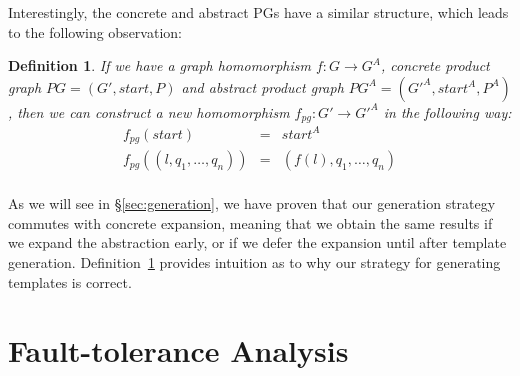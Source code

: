 \documentclass[numbers, 10pt, preprint]{sigplanconf}
\newcommand{\EG}{\emph{e.g.}}
\newcommand{\IE}{\emph{i.e.}}
\newtheorem{defn}{Definition}[section]
\begin{document}
Interestingly, the concrete and abstract PGs have a similar structure, which leads to the following observation:

\begin{defn}
\label{def:homomorphism}
If we have a graph homomorphism $f : G \rightarrow G^A$, concrete product graph $PG = (G',\mathit{start},P)$ and abstract product graph $PG^A = (G'^A, \mathit{start}^A, P^A)$, then we can construct a new homomorphism $f_{pg} : G' \rightarrow G'^A$ in the following way:
\[ \begin{array}{rcl}
  f_{pg}( \mathit{start} ) & = & \mathit{start}^A  \\
  f_{pg}( (l,q_1,\ldots,q_n) ) & = & (f(l),q_1,\ldots,q_n) \\
\end{array} \]
\end{defn}
%
As we will see in \S\ref{sec:generation}, we have proven that our generation strategy commutes with concrete expansion, meaning that we obtain the same results if we expand the abstraction early, or if we defer the expansion until after template generation.
%
Definition~\ref{def:homomorphism} provides intuition as to why our strategy for generating templates is correct.



%
%
%
%


\section{Fault-tolerance Analysis}
\label{sec:analysis}

\end{document}
